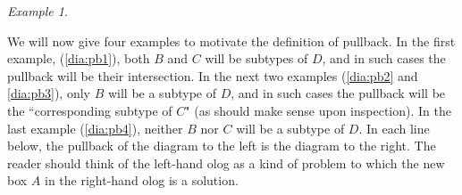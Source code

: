 \documentclass{amsart}
\theoremstyle{remark}
\newtheorem{example}[theorem]{Example}
\theoremstyle{definition}
\begin{document}
\begin{example}\label{ex:4 pbs}

We will now give four examples to motivate the definition of pullback. In the first example, (\ref{dia:pb1}), both $B$ and $C$ will be subtypes of $D$, and in such cases the pullback will be their intersection. In the next two examples (\ref{dia:pb2} and \ref{dia:pb3}), only $B$ will be a subtype of $D$, and in such cases the pullback will be the ``corresponding subtype of $C$" (as should make sense upon inspection). In the last example (\ref{dia:pb4}), neither $B$ nor $C$ will be a subtype of $D$.  In each line below, the pullback of the diagram to the left is the diagram to the right. The reader should  think of the left-hand olog as a kind of problem to which the new box $A$ in the right-hand olog is a solution.   


\end{example}
\end{document}
